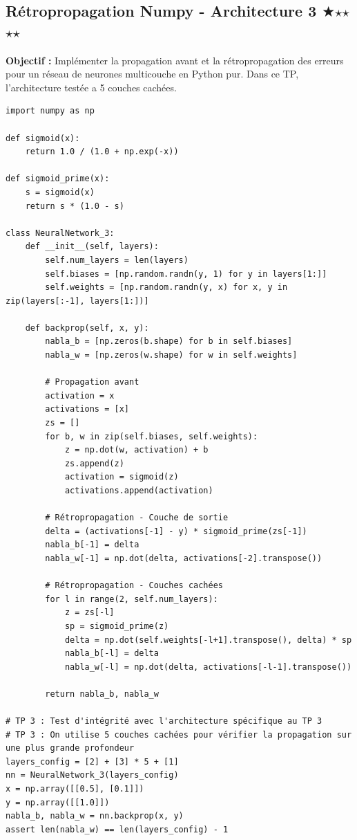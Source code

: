 \documentclass[11pt,a4paper]{article}
\begin{document}
\vspace{1cm}

\subsection*{Rétropropagation Numpy - Architecture 3 $\bigstar$$\star$$\star$$\star$$\star$}

\textbf{Objectif :}
Implémenter la propagation avant et la rétropropagation des erreurs pour un réseau de neurones multicouche en Python pur.
Dans ce TP, l'architecture testée a 5 couches cachées.

\begin{lstlisting}
import numpy as np

def sigmoid(x):
    return 1.0 / (1.0 + np.exp(-x))

def sigmoid_prime(x):
    s = sigmoid(x)
    return s * (1.0 - s)

class NeuralNetwork_3:
    def __init__(self, layers):
        self.num_layers = len(layers)
        self.biases = [np.random.randn(y, 1) for y in layers[1:]]
        self.weights = [np.random.randn(y, x) for x, y in zip(layers[:-1], layers[1:])]

    def backprop(self, x, y):
        nabla_b = [np.zeros(b.shape) for b in self.biases]
        nabla_w = [np.zeros(w.shape) for w in self.weights]

        # Propagation avant
        activation = x
        activations = [x]
        zs = []
        for b, w in zip(self.biases, self.weights):
            z = np.dot(w, activation) + b
            zs.append(z)
            activation = sigmoid(z)
            activations.append(activation)

        # Rétropropagation - Couche de sortie
        delta = (activations[-1] - y) * sigmoid_prime(zs[-1])
        nabla_b[-1] = delta
        nabla_w[-1] = np.dot(delta, activations[-2].transpose())

        # Rétropropagation - Couches cachées
        for l in range(2, self.num_layers):
            z = zs[-l]
            sp = sigmoid_prime(z)
            delta = np.dot(self.weights[-l+1].transpose(), delta) * sp
            nabla_b[-l] = delta
            nabla_w[-l] = np.dot(delta, activations[-l-1].transpose())

        return nabla_b, nabla_w

# TP 3 : Test d'intégrité avec l'architecture spécifique au TP 3
# TP 3 : On utilise 5 couches cachées pour vérifier la propagation sur une plus grande profondeur
layers_config = [2] + [3] * 5 + [1]
nn = NeuralNetwork_3(layers_config)
x = np.array([[0.5], [0.1]])
y = np.array([[1.0]])
nabla_b, nabla_w = nn.backprop(x, y)
assert len(nabla_w) == len(layers_config) - 1
\end{lstlisting}
\end{document}
